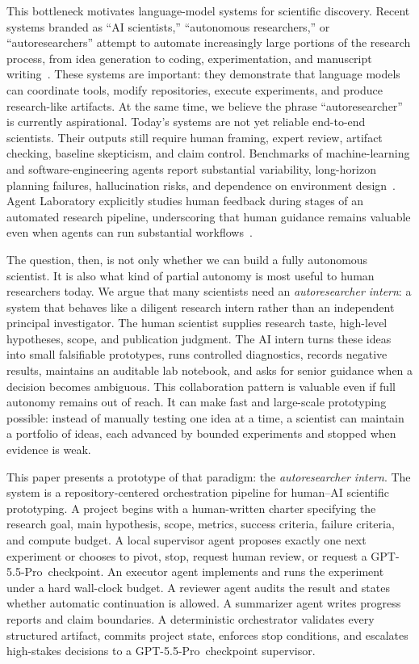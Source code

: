 \documentclass{article}
\newcommand{\intern}{\emph{autoresearcher intern}}
\newcommand{\gptpro}{GPT-5.5-Pro}
\begin{document}
This bottleneck motivates language-model systems for scientific discovery. Recent systems branded as ``AI scientists,'' ``autonomous researchers,'' or ``autoresearchers'' attempt to automate increasingly large portions of the research process, from idea generation to coding, experimentation, and manuscript writing~\citep{lu2024aiscientist,yamada2025aiscientistv2,schmidgall2025agentlab,ghareeb2025robin,ghafarollahi2024sciagents}. These systems are important: they demonstrate that language models can coordinate tools, modify repositories, execute experiments, and produce research-like artifacts. At the same time, we believe the phrase ``autoresearcher'' is currently aspirational. Today's systems are not yet reliable end-to-end scientists. Their outputs still require human framing, expert review, artifact checking, baseline skepticism, and claim control. Benchmarks of machine-learning and software-engineering agents report substantial variability, long-horizon planning failures, hallucination risks, and dependence on environment design~\citep{huang2023mlagentbench,jimenez2023swebench,yang2024sweagent}. Agent Laboratory explicitly studies human feedback during stages of an automated research pipeline, underscoring that human guidance remains valuable even when agents can run substantial workflows~\citep{schmidgall2025agentlab}.

The question, then, is not only whether we can build a fully autonomous scientist. It is also what kind of partial autonomy is most useful to human researchers today. We argue that many scientists need an \intern: a system that behaves like a diligent research intern rather than an independent principal investigator. The human scientist supplies research taste, high-level hypotheses, scope, and publication judgment. The AI intern turns these ideas into small falsifiable prototypes, runs controlled diagnostics, records negative results, maintains an auditable lab notebook, and asks for senior guidance when a decision becomes ambiguous. This collaboration pattern is valuable even if full autonomy remains out of reach. It can make fast and large-scale prototyping possible: instead of manually testing one idea at a time, a scientist can maintain a portfolio of ideas, each advanced by bounded experiments and stopped when evidence is weak.

This paper presents a prototype of that paradigm: the \intern. The system is a repository-centered orchestration pipeline for human--AI scientific prototyping. A project begins with a human-written charter specifying the research goal, main hypothesis, scope, metrics, success criteria, failure criteria, and compute budget. A local supervisor agent proposes exactly one next experiment or chooses to pivot, stop, request human review, or request a \gptpro\ checkpoint. An executor agent implements and runs the experiment under a hard wall-clock budget. A reviewer agent audits the result and states whether automatic continuation is allowed. A summarizer agent writes progress reports and claim boundaries. A deterministic orchestrator validates every structured artifact, commits project state, enforces stop conditions, and escalates high-stakes decisions to a \gptpro\ checkpoint supervisor.
\end{document}
